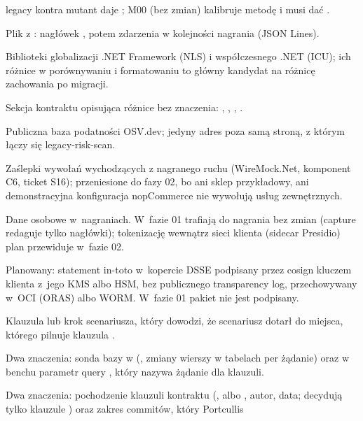 \begin{description}[style=nextline, leftmargin=1.2em, font=\normalfont\bfseries]
         legacy kontra mutant daje ; M00 (bez zmian)
        kalibruje metodę i musi dać .
  \item[nagranie] Plik  z : nagłówek
        , potem zdarzenia  w kolejności
        nagrania (JSON Lines).
  \item[NLS / ICU] Biblioteki globalizacji .NET Framework (NLS) i współczesnego .NET
        (ICU); ich różnice w porównywaniu i formatowaniu to główny kandydat na różnicę
        zachowania po migracji.
  \item[normalizacja] Sekcja kontraktu opisująca różnice bez znaczenia:
        , , , .
  \item[OSV] Publiczna baza podatności OSV.dev; jedyny adres poza samą stroną, z którym łączy
        się legacy-risk-scan.
  \item[outbound stubs] Zaślepki wywołań wychodzących z nagranego ruchu (WireMock.Net,
        komponent C6, ticket S16); przeniesione do fazy 02, bo ani sklep przykładowy, ani
        demonstracyjna konfiguracja nopCommerce nie wywołują usług zewnętrznych.
  \item[PII] Dane osobowe w~nagraniach. W~fazie 01 trafiają do nagrania bez zmian (capture
        redaguje tylko nagłówki); tokenizację wewnątrz sieci klienta (sidecar Presidio)
        plan przewiduje w~fazie 02.
  \item[podpis pakietu (faza 03)] Planowany: statement in-toto w~kopercie DSSE podpisany
        przez cosign kluczem klienta z~jego KMS albo HSM, bez publicznego transparency log,
        przechowywany w~OCI (ORAS) albo WORM. W~fazie 01 pakiet nie jest podpisany.
  \item[pozytywny bliźniak] Klauzula lub krok scenariusza, który dowodzi, że scenariusz
        dotarł do miejsca, którego pilnuje klauzula .
  \item[probe] Dwa znaczenia: sonda bazy w 
        (, zmiany wierszy w tabelach per żądanie) oraz w benchu
        parametr query , który nazywa żądanie dla klauzuli.
  \item[provenance] Dwa znaczenia: pochodzenie klauzuli kontraktu (,
          albo , autor, data;
        decydują tylko klauzule ) oraz zakres commitów, który Portcullis

\end{description}
